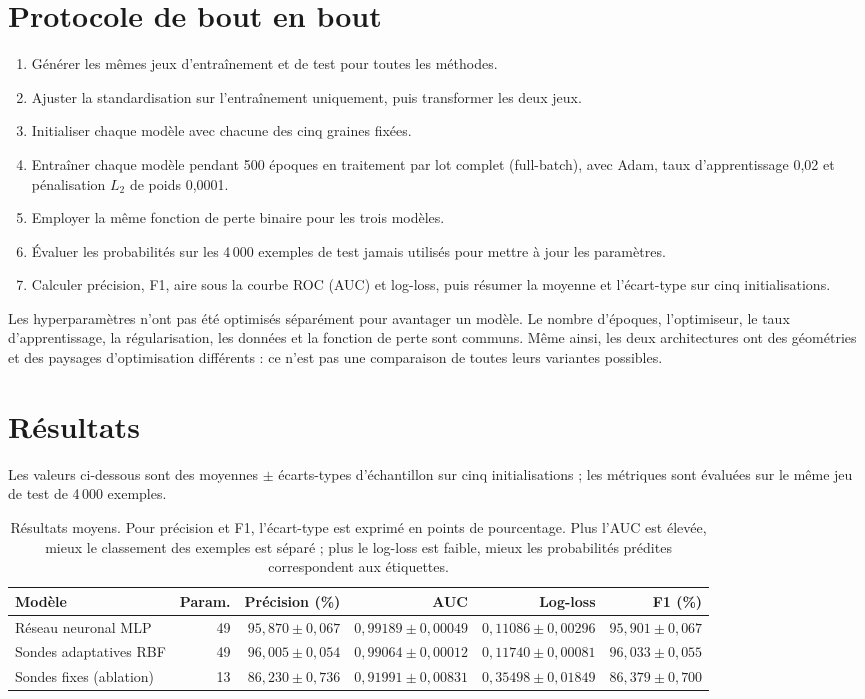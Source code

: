 \documentclass[11pt,a4paper]{article}
\begin{document}
\section{Protocole de bout en bout}
\begin{enumerate}[leftmargin=1.5em]
  \item Générer les mêmes jeux d'entraînement et de test pour toutes les méthodes.
  \item Ajuster la standardisation sur l'entraînement uniquement, puis transformer les deux jeux.
  \item Initialiser chaque modèle avec chacune des cinq graines fixées.
  \item Entraîner chaque modèle pendant 500 époques en traitement par lot complet (full-batch), avec Adam, taux d'apprentissage 0,02 et pénalisation $L_2$ de poids 0,0001.
  \item Employer la même fonction de perte binaire pour les trois modèles.
  \item Évaluer les probabilités sur les 4\,000 exemples de test jamais utilisés pour mettre à jour les paramètres.
  \item Calculer précision, F1, aire sous la courbe ROC (AUC) et log-loss, puis résumer la moyenne et l'écart-type sur cinq initialisations.
\end{enumerate}
Les hyperparamètres n'ont pas été optimisés séparément pour avantager un modèle. Le nombre d'époques, l'optimiseur, le taux d'apprentissage, la régularisation, les données et la fonction de perte sont communs. Même ainsi, les deux architectures ont des géométries et des paysages d'optimisation différents : ce n'est pas une comparaison de toutes leurs variantes possibles.

\section{Résultats}
Les valeurs ci-dessous sont des moyennes $\pm$ écarts-types d'échantillon sur cinq initialisations ; les métriques sont évaluées sur le même jeu de test de 4\,000 exemples.

\begin{table}[H]
\centering
\small
\setlength{\tabcolsep}{4pt}
\begin{tabular}{p{3.0cm}r r r r r}
\toprule
\textbf{Modèle} & \textbf{Param.} & \textbf{Précision (\%)} & \textbf{AUC} & \textbf{Log-loss} & \textbf{F1 (\%)}\\
\midrule
Réseau neuronal MLP & 49 & $95,870\pm0,067$ & $0,99189\pm0,00049$ & $0,11086\pm0,00296$ & $95,901\pm0,067$\\
Sondes adaptatives RBF & 49 & $96,005\pm0,054$ & $0,99064\pm0,00012$ & $0,11740\pm0,00081$ & $96,033\pm0,055$\\
Sondes fixes (ablation) & 13 & $86,230\pm0,736$ & $0,91991\pm0,00831$ & $0,35498\pm0,01849$ & $86,379\pm0,700$\\
\bottomrule
\end{tabular}
\caption{Résultats moyens. Pour précision et F1, l'écart-type est exprimé en points de pourcentage. Plus l'AUC est élevée, mieux le classement des exemples est séparé ; plus le log-loss est faible, mieux les probabilités prédites correspondent aux étiquettes.}
\end{table}
\end{document}
